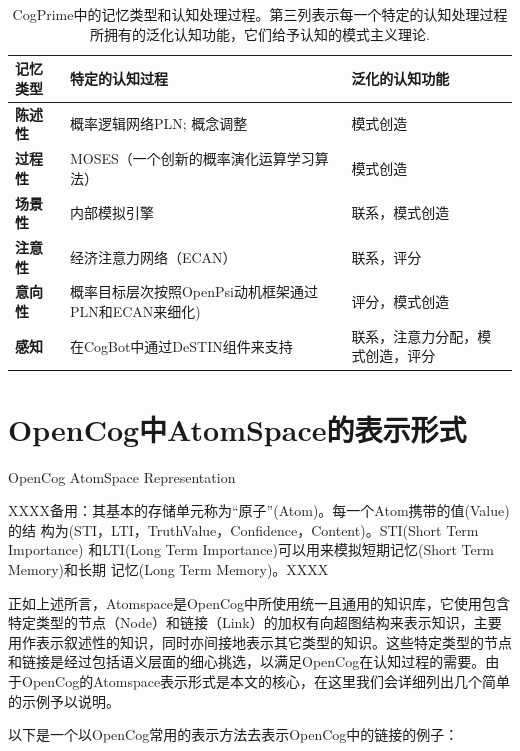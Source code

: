 \begin{table}[ht]
\centering
\begin{tabular}{|Y{3cm}|Y{5cm}|Y{3cm}|}
\hline \textbf{记忆类型} & \textbf{特定的认知过程} & {\bf 泛化的认知功能} \\ \hline
\textbf{陈述性} & 概率逻辑网络PLN\cite{Goertzel2008}; 概念调整\cite{Fauconnier2002} & 模式创造 \\ \hline
\textbf{过程性} & MOSES（一个创新的概率演化运算学习算法）\cite{Looks2006} & 模式创造 \\ \hline
\textbf{场景性} & 内部模拟引擎\cite{Goertzel2008d} & 联系，模式创造 \\ \hline
\textbf{注意性} & 经济注意力网络（ECAN）\cite{Goertzel2010} & 联系，评分 \\ \hline
\textbf{意向性} & 概率目标层次按照OpenPsi动机框架通过PLN和ECAN来细化\cite{Bach2009}) & 评分，模式创造 \\ \hline
\textbf{感知} & 在CogBot中通过DeSTIN组件来支持 & 联系，注意力分配，模式创造，评分 \\ \hline
\end{tabular}%
\caption{CogPrime中的记忆类型和认知处理过程。第三列表示每一个特定的认知处理过程所拥有的泛化认知功能，它们给予认知的模式主义理论.}
\label{tab:opencog} 
\end{table}

\section{OpenCog中AtomSpace的表示形式}{OpenCog AtomSpace Representation}
\label{sec:atoms}

XXXX备用：其基本的存储单元称为“原子”(Atom)。每一个Atom携带的值(Value)的结
构为(STI，LTI，TruthValue，Confidence，Content)。STI(Short Term Importance)
和LTI(Long Term Importance)可以用来模拟短期记忆(Short Term Memory)和长期
记忆(Long Term Memory)。XXXX

正如上述所言，Atomspace是OpenCog中所使用统一且通用的知识库，它使用包含特定类型的节点（Node）和链接（Link）的加权有向超图结构来表示知识，主要用作表示叙述性的知识，同时亦间接地表示其它类型的知识。这些特定类型的节点和链接是经过包括语义层面的细心挑选，以满足OpenCog在认知过程的需要。由于OpenCog的Atomspace表示形式是本文的核心，在这里我们会详细列出几个简单的示例予以说明。

以下是一个以OpenCog常用的表示方法去表示OpenCog中的链接的例子：
 
